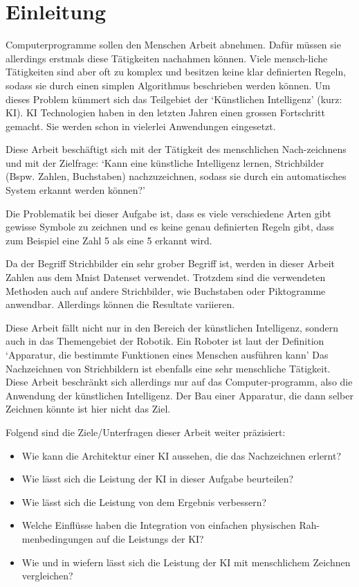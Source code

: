 \chapter{Einleitung}
Computerprogramme sollen den Menschen Arbeit abnehmen. Dafür müssen sie
allerdings erstmals diese Tätigkeiten nachahmen können. Viele mensch\hyp{}liche
Tätigkeiten sind aber oft zu komplex und besitzen keine klar definierten Regeln,
sodass sie durch einen simplen Algorithmus beschrieben werden können. Um dieses
Problem kümmert sich das Teilgebiet der `Künstlichen Intelligenz' (kurz: KI). KI
Technologien haben in den letzten Jahren einen grossen Fortschritt gemacht. Sie
werden schon in vielerlei Anwendungen eingesetzt.

Diese Arbeit beschäftigt sich mit der Tätigkeit des menschlichen Nach\hyp{}zeichnens
und mit der Zielfrage: `Kann eine künstliche Intelligenz lernen, Strichbilder
(Bspw. Zahlen, Buchstaben) nachzuzeichnen, sodass sie durch ein automatisches
System erkannt werden können?'

Die Problematik bei dieser Aufgabe ist, dass es viele verschiedene Arten gibt
gewisse Symbole zu zeichnen und es keine genau definierten Regeln gibt, dass zum
Beispiel eine Zahl 5 als eine 5 erkannt wird.

Da der Begriff Strichbilder ein sehr grober Begriff ist, werden in dieser Arbeit
Zahlen aus dem Mnist Datenset verwendet. %
Trotzdem sind die verwendeten Methoden auch auf andere Strichbilder, wie
Buchstaben oder Piktogramme anwendbar. Allerdings können die Resultate
variieren.

Diese Arbeit fällt nicht nur in den Bereich der künstlichen Intelligenz, sondern
auch in das Themengebiet der Robotik. Ein Roboter ist laut der Definition
`Apparatur, die bestimmte Funktionen eines Menschen ausführen kann'
\cite{noauthor_duden_nodate-1} Das Nachzeichnen von Strichbildern ist ebenfalls
eine sehr menschliche Tätigkeit. Diese Arbeit beschränkt sich allerdings nur auf
das Computer\hyp{}programm, also die Anwendung der künstlichen Intelligenz. Der Bau
einer Apparatur, die dann selber Zeichnen könnte ist hier nicht das Ziel.

Folgend sind die Ziele/Unterfragen dieser Arbeit weiter präzisiert:
\begin{itemize}
    \item Wie kann die Architektur einer KI aussehen, die das Nachzeichnen
    erlernt?
    \item Wie lässt sich die Leistung der KI in dieser Aufgabe beurteilen?
    \item Wie lässt sich die Leistung von dem Ergebnis verbessern?
    \item Welche Einflüsse haben die Integration von einfachen physischen
    Rah\hyp{}menbedingungen auf die Leistungs der KI?
    \item Wie und in wiefern lässt sich die Leistung der KI mit menschlichem
    Zeichnen vergleichen?
\end{itemize}
